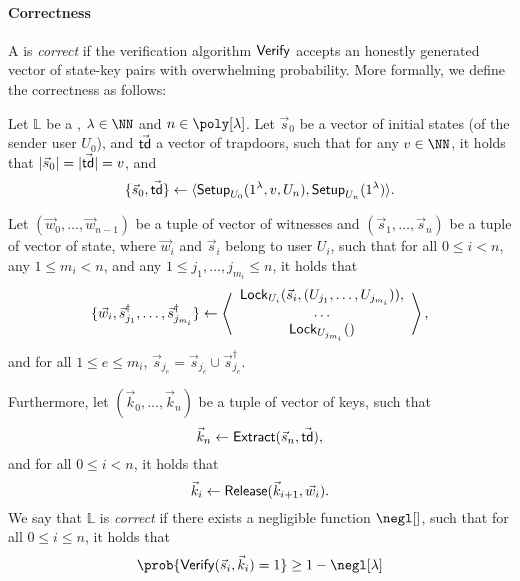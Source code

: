 \paragraph{Correctness} A \sysname is \emph{correct} if the verification algorithm $\mathsf{Verify}$ accepts 
an honestly generated vector of state-key pairs with overwhelming probability. More formally, we define 
the correctness as follows:

\begin{definition}
Let $\mathbb{L}$ be a \sysname, $\lambda \in \NN$ and $n \in \poly[\lambda]$. Let $\vec{s}_0$ be a 
vector of initial states (of the sender user $U_0$), and $\vec{\mathsf{td}}$ a vector of trapdoors, such that for any 
$v \in \NN$, it holds that $|\vec{s}_0| = |\vec{\mathsf{td}}| = v$, and
\[
	\{\vec{s}_0, \vec{\mathsf{td}}\} \gets \langle \mathsf{Setup}_{U_0}(1^\lambda, v, U_n),\mathsf{Setup}_{U_n}(1^\lambda) \rangle.
\]

Let $(\vec{w}_0,\ldots,\vec{w}_{n-1})$ be a tuple of vector of witnesses and $(\vec{s}_1,\ldots,\vec{s}_n)$
be a tuple of vector of state, where $\vec{w}_i$ and $\vec{s}_i$ belong to user $U_i$, such that for all 
$0 \leq i < n$, any $1 \leq m_i < n$, and any $1 \leq j_1,\ldots,j_{m_i} \leq n$, it holds that 
\[
	\{\vec{w}_i,\vec{s}_{j_1}^\dag,\ldots,\vec{s}_{j_{m_i}}^\dag\} \gets
	\left\langle 
		\begin{array}{c}
			\mathsf{Lock}_{U_i}(\vec{s}_i, (U_{j_1},\ldots,U_{j_{m_i}})), 	\\
			\ldots 													\\
			\mathsf{Lock}_{U_{j_{m_i}}}() 									\\
		\end{array}
	\right\rangle,
\]
and for all $1 \leq e \leq m_i$, $\vec{s}_{j_e} = \vec{s}_{j_e} \cup \vec{s}_{j_e}^\dag$.

Furthermore, let $(\vec{k}_0,\ldots,\vec{k}_n)$ be a tuple of vector of keys, such that 
\[
	\vec{k}_n \gets \mathsf{Extract}(\vec{s}_n,\vec{\mathsf{td}}),
\]
and for all $0 \leq i < n$, it holds that
\[
	\vec{k}_i \gets \mathsf{Release}(\vec{k}_{i+1},\vec{w}_i).
\]
We say that $\mathbb{L}$ is \emph{correct} if there exists a negligible function $\negl[]$, such that 
for all $0 \leq i \leq n$, it holds that
\[
	\prob{\Verify(\vec{s}_i, \vec{k}_i) = 1} \geq 1 - \negl[\lambda]
\]
\end{definition}